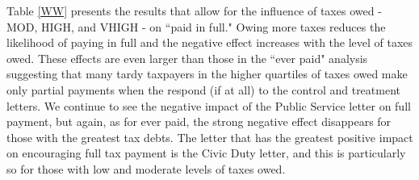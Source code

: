 \documentclass[12pt,titlepage]{article}
\begin{document}
Table \ref{WW} presents the results that allow for the influence of
taxes owed - MOD, HIGH, and VHIGH - on ``paid in full."  Owing more
taxes reduces the likelihood of paying in full and the negative effect
increases with the level of taxes owed.  These effects are even larger
than those in the ``ever paid" analysis suggesting that many tardy
taxpayers in the higher quartiles of taxes owed make only partial
payments when the respond (if at all) to the control and treatment
letters.  We continue to see the negative impact of the Public Service
letter on full payment, but again, as for ever paid, the strong
negative effect disappears for those with the greatest tax debts.  The
letter that has the greatest positive impact on encouraging full tax
payment is the Civic Duty letter, and this is particularly so for
those with low and moderate levels of taxes owed.
\end{document}
